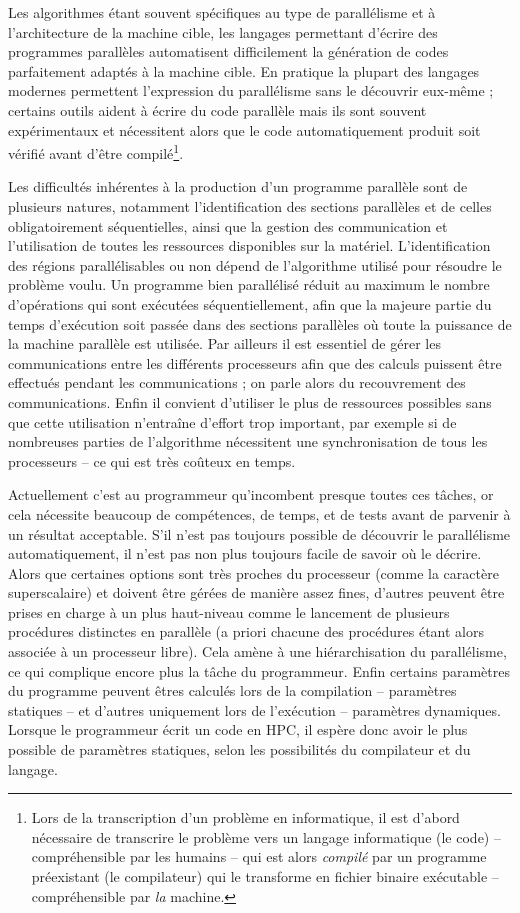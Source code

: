 Les algorithmes étant souvent spécifiques au type de parallélisme et à l'architecture de la machine cible, les langages permettant d'écrire des programmes parallèles automatisent difficilement la génération de codes parfaitement adaptés à la machine cible. En pratique la plupart des langages modernes permettent l'expression du parallélisme sans le découvrir eux-même ; certains outils aident à écrire du code parallèle mais ils sont souvent expérimentaux et nécessitent alors que le code automatiquement produit soit vérifié avant d'être compilé\footnote{Lors de la transcription d'un problème en informatique, il est d'abord nécessaire de transcrire le problème vers un langage informatique (le code) -- compréhensible par les humains -- qui est alors \emph{compilé} par un programme préexistant (le compilateur) qui le transforme en fichier binaire exécutable -- compréhensible par \emph{la} machine.}.

Les difficultés inhérentes à la production d'un programme parallèle sont de plusieurs natures, notamment l'identification des sections parallèles et de celles obligatoirement séquentielles, ainsi que la gestion des communication et l'utilisation de toutes les ressources disponibles sur la matériel. L'identification des régions parallélisables ou non dépend de l'algorithme utilisé pour résoudre le problème voulu. Un programme bien parallélisé réduit au maximum le nombre d'opérations qui sont exécutées séquentiellement, afin que la majeure partie du temps d'exécution soit passée dans des sections parallèles où toute la puissance de la machine parallèle est utilisée. Par ailleurs il est essentiel de gérer les communications entre les différents processeurs afin que des calculs puissent être effectués pendant les communications ; on parle alors du recouvrement des communications. Enfin il convient d'utiliser le plus de ressources possibles sans que cette utilisation n'entraîne d'effort trop important, par exemple si de nombreuses parties de l'algorithme nécessitent une synchronisation de tous les processeurs -- ce qui est très coûteux en temps.

Actuellement c'est au programmeur qu'incombent presque toutes ces tâches, or cela nécessite beaucoup de compétences, de temps, et de tests avant de parvenir à un résultat acceptable. S'il n'est pas toujours possible de découvrir le parallélisme automatiquement, il n'est pas non plus toujours facile de savoir où le décrire. Alors que certaines options sont très proches du processeur (comme la caractère superscalaire) et doivent être gérées de manière assez fines, d'autres peuvent être prises en charge à un plus haut-niveau comme le lancement de plusieurs procédures distinctes en parallèle (a priori chacune des procédures étant alors associée à un processeur libre). Cela amène à une hiérarchisation du parallélisme, ce qui complique encore plus la tâche du programmeur. Enfin certains paramètres du programme peuvent êtres calculés lors de la compilation -- paramètres statiques -- et d'autres uniquement lors de l'exécution -- paramètres dynamiques. Lorsque le programmeur écrit un code en HPC, il espère donc avoir le plus possible de paramètres statiques, selon les possibilités du compilateur et du langage. 


